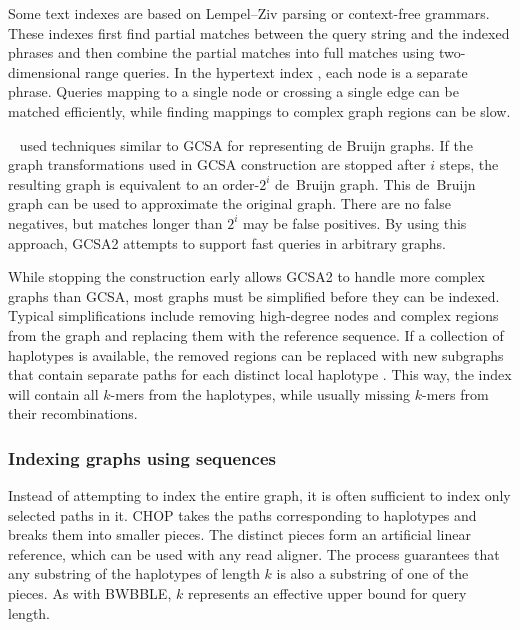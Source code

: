 Some text indexes are based on Lempel--Ziv parsing or context-free grammars.
These indexes first find partial matches between the query string and the indexed phrases and then combine the partial matches into full matches using two-dimensional range queries.
In the hypertext index \cite{Thachuk_2013}, each node is a separate phrase.
Queries mapping to a single node or crossing a single edge can be matched efficiently, while finding mappings to complex graph regions can be slow.

\citeauthor{Bowe_2012}\ \cite{Bowe_2012} used techniques similar to GCSA for representing de Bruijn graphs.
If the graph transformations used in GCSA construction are stopped after $i$ steps, the resulting graph is equivalent to an order-$2^{i}$ de~Bruijn graph.
This de~Bruijn graph can be used to approximate the original graph.
There are no false negatives, but matches longer than $2^{i}$ may be false positives.
By using this approach, GCSA2 \cite{Siren_2017} attempts to support fast queries in arbitrary graphs.

While stopping the construction early allows GCSA2 to handle more complex graphs than GCSA, most graphs must be simplified before they can be indexed.
Typical simplifications include removing high-degree nodes and complex regions from the graph and replacing them with the reference sequence.
If a collection of haplotypes is available, the removed regions can be replaced with new subgraphs that contain separate paths for each distinct local haplotype \cite{Siren_2019}.
This way, the index will contain all $k$-mers from the haplotypes, while usually missing $k$-mers from their recombinations.

\subsubsection{Indexing graphs using sequences}

Instead of attempting to index the entire graph, it is often sufficient to index only selected paths in it.
CHOP \cite{Mokveld_2018} takes the paths corresponding to haplotypes and breaks them into smaller pieces.
The distinct pieces form an artificial linear reference, which can be used with any read aligner.
The process guarantees that any substring of the haplotypes of length $k$ is also a substring of one of the pieces.
As with BWBBLE, $k$ represents an effective upper bound for query length.

